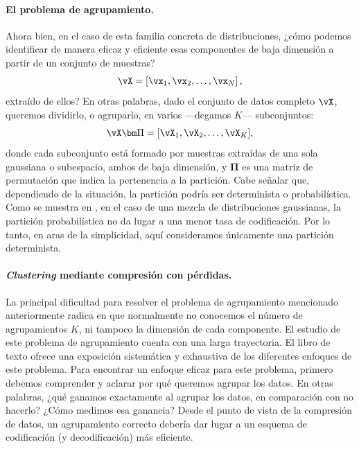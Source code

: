 \documentclass[../../book-main.tex]{subfiles}
\begin{document}
\paragraph{El problema de agrupamiento.}
Ahora bien, en el caso de esta familia concreta de distribuciones, ¿cómo podemos identificar de manera eficaz
y eficiente esas componentes de baja dimensión a partir de un conjunto de muestras?
\begin{equation}
    \vX = \left[\vx_1, \vx_2, \ldots, \vx_N\right],
\end{equation}
extraído de ellos? En otras palabras, dado el conjunto de datos completo $\vX$,
queremos dividirlo, o agruparlo, en varios ---degamos $K$--- subconjuntos:
\begin{equation}
    \vX\bm \Pi = [\vX_1, \vX_2, \dots, \vX_K],
\end{equation}
donde cada subconjunto está formado por muestras extraídas de una sola
gaussiana o subespacio, ambos de baja dimensión, y $\bm \Pi$ es una matriz de permutación
que indica la pertenencia a la partición. Cabe señalar que, dependiendo de
la situación, la partición podría ser determinista o
probabilística. Como se muestra en \cite{ma2007segmentation}, en el caso de una mezcla de
distribuciones gaussianas, la partición probabilística no da lugar a una menor tasa de codificación.
Por lo tanto, en aras de la simplicidad, aquí consideramos únicamente una partición determinista.

\paragraph{\textit{Clustering} mediante compresión con pérdidas.}
La principal dificultad para resolver el problema de agrupamiento mencionado anteriormente radica en que
normalmente no conocemos el número de agrupamientos $K$, ni tampoco
la dimensión de cada componente. El estudio de este problema de agrupamiento
cuenta con una larga trayectoria. El libro de texto \cite{GPCA} ofrece
una exposición sistemática y exhaustiva de los diferentes enfoques de
este problema. Para encontrar un enfoque eficaz para este problema, primero
debemos comprender y aclarar por qué queremos agrupar los datos. En otras
palabras, ¿qué ganamos exactamente al agrupar los datos, en comparación
con no hacerlo? ¿Cómo medimos esa ganancia? Desde el punto de vista de la
compresión de datos, un agrupamiento correcto debería dar lugar a un esquema de
codificación (y decodificación) más eficiente.
\end{document}
